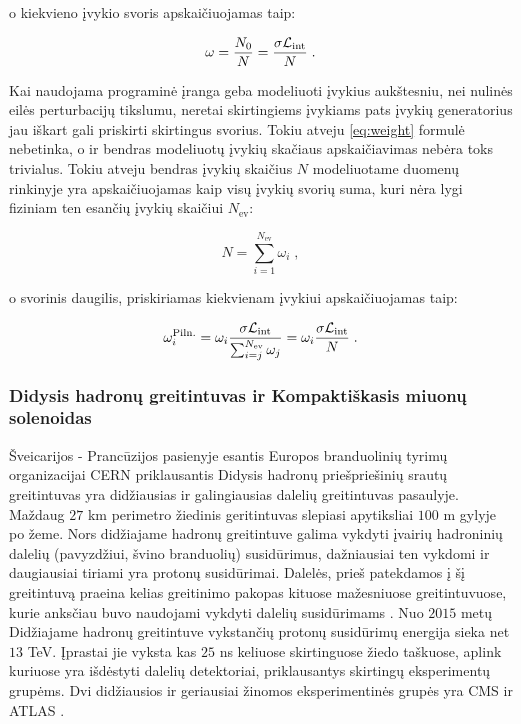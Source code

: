 \documentclass[a4paper, 12pt]{article}
\newcommand{\Lumi}{{\cal L}_\mathrm{int}}
\newlength\q
\begin{document}
o kiekvieno įvykio svoris apskaičiuojamas taip:

\begin{equation}
	\omega = \frac{ N_{0} }{ N } = \frac{ \sigma \Lumi }{N} \; .
	\label{eq:weight}
\end{equation}

Kai naudojama programinė įranga geba modeliuoti įvykius aukštesniu, nei nulinės eilės
perturbacijų tikslumu, neretai skirtingiems įvykiams pats įvykių generatorius jau iškart
gali priskirti skirtingus svorius.
Tokiu atveju \eqref{eq:weight} formulė nebetinka, o ir bendras modeliuotų įvykių skačiaus
apskaičiavimas nebėra toks trivialus.
Tokiu atveju bendras įvykių skaičius $N$ modeliuotame duomenų rinkinyje yra apskaičiuojamas
kaip visų įvykių svorių suma, kuri nėra lygi fiziniam ten esančių įvykių skaičiui $N_{\mathrm{ev}}$:

\begin{equation}
	N = \sum_{i=1}^{N_{\mathrm{ev}}} \omega_{i} \; ,
\end{equation}

o svorinis daugilis, priskiriamas kiekvienam įvykiui apskaičiuojamas taip:

\begin{equation}
	\omega_{i}^{\mathrm{Piln.}} = \omega_{i} \frac{ \sigma\Lumi }{ \sum_{i=j}^{N_{\mathrm{ev}}}\omega_{j} } =
	\omega_{i} \frac{ \sigma\Lumi }{N} \; .
	\label{eq:NLOweight}
\end{equation}

\subsubsection{Didysis hadronų greitintuvas ir Kompaktiškasis miuonų solenoidas}

Šveicarijos - Prancūzijos pasienyje esantis Europos branduolinių tyrimų organizacijai CERN
priklausantis Didysis hadronų priešpriešinių srautų greitintuvas yra didžiausias ir galingiausias
dalelių greitintuvas pasaulyje.
Maždaug $27$ km perimetro žiedinis geritintuvas slepiasi apytiksliai $100$ m gylyje po žeme.
Nors didžiajame hadronų greitintuve galima vykdyti įvairių hadroninių dalelių (pavyzdžiui, švino
branduolių) susidūrimus, dažniausiai ten vykdomi ir daugiausiai tiriami yra protonų susidūrimai.
Dalelės, prieš patekdamos į šį greitintuvą praeina kelias greitinimo pakopas kituose mažesniuose
greitintuvuose, kurie anksčiau buvo naudojami vykdyti dalelių susidūrimams \cite{accelerators}.
Nuo $2015$ metų Didžiajame hadronų greitintuve vykstančių protonų susidūrimų energija sieka net $13$ TeV.
Įprastai jie vyksta kas $25$ ns keliuose skirtinguose žiedo taškuose, aplink kuriuose yra išdėstyti dalelių
detektoriai, priklausantys skirtingų eksperimentų grupėms.
Dvi didžiausios ir geriausiai žinomos eksperimentinės grupės yra CMS ir ATLAS \cite{LHCexperiments}.
\end{document}
